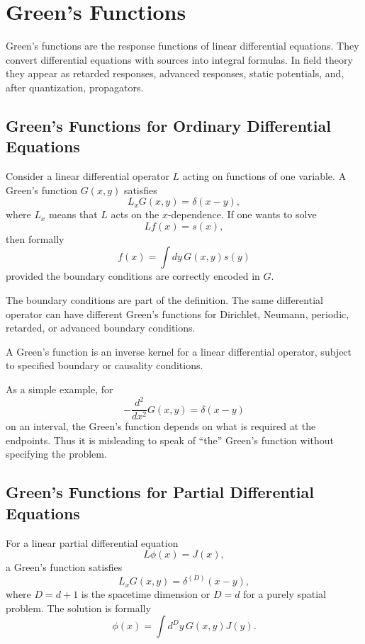 \chapter{Green's Functions}

\begin{remarkbox}
Green's functions are the response functions of linear differential equations.
They convert differential equations with sources into integral formulas. In field
theory they appear as retarded responses, advanced responses, static potentials,
and, after quantization, propagators.
\end{remarkbox}

\section{Green's Functions for Ordinary Differential Equations}

Consider a linear differential operator \(L\) acting on functions of one
variable. A Green's function \(G(x,y)\) satisfies
\[
    L_xG(x,y)=\delta(x-y),
\]
where \(L_x\) means that \(L\) acts on the \(x\)-dependence. If one wants to
solve
\[
    Lf(x)=s(x),
\]
then formally
\[
    f(x)=\int dy\,G(x,y)s(y)
\]
provided the boundary conditions are correctly encoded in \(G\).

The boundary conditions are part of the definition. The same differential
operator can have different Green's functions for Dirichlet, Neumann, periodic,
retarded, or advanced boundary conditions.

\begin{definitionbox}
A Green's function is an inverse kernel for a linear differential operator,
subject to specified boundary or causality conditions.
\end{definitionbox}

As a simple example, for
\[
    -\frac{d^2}{dx^2}G(x,y)=\delta(x-y)
\]
on an interval, the Green's function depends on what is required at the endpoints.
Thus it is misleading to speak of ``the'' Green's function without specifying the
problem.

\section{Green's Functions for Partial Differential Equations}

For a linear partial differential equation
\[
    L\phi(x)=J(x),
\]
a Green's function satisfies
\[
    L_xG(x,y)=\delta^{(D)}(x-y),
\]
where \(D=d+1\) is the spacetime dimension or \(D=d\) for a purely spatial
problem. The solution is formally
\[
    \phi(x)=\int d^D y\,G(x,y)J(y).
\]

